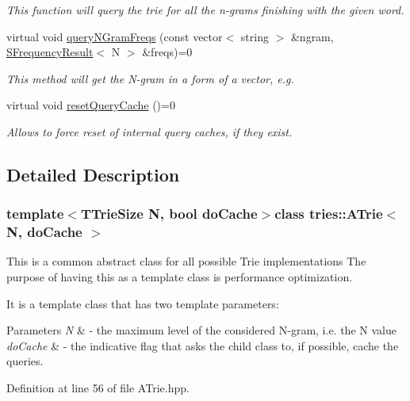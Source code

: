 \begin{DoxyCompactItemize}
\begin{DoxyCompactList}\small\item\em This function will query the trie for all the n-\/grams finishing with the given word. \end{DoxyCompactList}\item 
virtual void \hyperlink{classtries_1_1_a_trie_af61c5b7d5b457ce246e5a96553e2075d}{query\+N\+Gram\+Freqs} (const vector$<$ string $>$ \&ngram, \hyperlink{structtries_1_1_s_frequency_result}{S\+Frequency\+Result}$<$ N $>$ \&freqs)=0
\begin{DoxyCompactList}\small\item\em This method will get the N-\/gram in a form of a vector, e.\+g. \end{DoxyCompactList}\item 
virtual void \hyperlink{classtries_1_1_a_trie_a029b5c975cf279d569ab948ab7fd87f0}{reset\+Query\+Cache} ()=0
\begin{DoxyCompactList}\small\item\em Allows to force reset of internal query caches, if they exist. \end{DoxyCompactList}\end{DoxyCompactItemize}


\subsection{Detailed Description}
\subsubsection*{template$<$T\+Trie\+Size N, bool do\+Cache$>$class tries\+::\+A\+Trie$<$ N, do\+Cache $>$}

This is a common abstract class for all possible Trie implementations The purpose of having this as a template class is performance optimization. 

It is a template class that has two template parameters\+: 
\begin{DoxyParams}{Parameters}
{\em N} & -\/ the maximum level of the considered N-\/gram, i.\+e. the N value \\
\hline
{\em do\+Cache} & -\/ the indicative flag that asks the child class to, if possible, cache the queries. \\
\hline
\end{DoxyParams}


Definition at line 56 of file A\+Trie.\+hpp.



